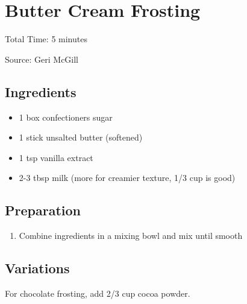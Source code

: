 \section{Butter Cream Frosting}

\begin{center}
Total Time: 5 minutes

\vspace{1em}

Source: Geri McGill

\end{center}

\subsection{Ingredients}
\begin{itemize}
    \item 1 box confectioners sugar
    \item 1 stick unsalted butter (softened)
    \item 1 tsp vanilla extract
    \item 2-3 tbsp milk (more for creamier texture, 1/3 cup is good)
\end{itemize}

\subsection{Preparation}
\begin{enumerate}
    \item Combine ingredients in a mixing bowl and mix until smooth
\end{enumerate}

\subsection{Variations}
For chocolate frosting, add 2/3 cup cocoa powder.
